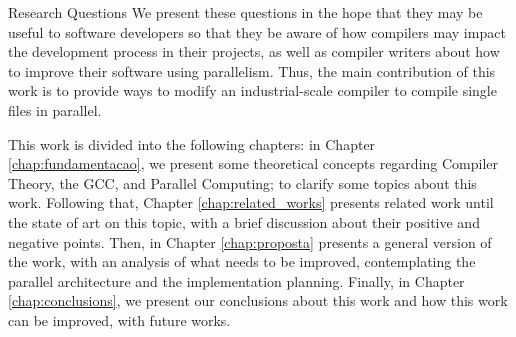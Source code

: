 \begin{section}{Research Questions}
We present these questions in the hope that they may be useful to software
developers so that they be aware of how compilers may impact the development
process in their projects, as well as compiler writers about how to improve
their software using parallelism. Thus, the main contribution of this work is
to provide ways to modify an industrial-scale compiler to
compile single files in parallel.

This work is divided into the following chapters: in Chapter
\ref{chap:fundamentacao}, we present some theoretical concepts regarding
Compiler Theory, the GCC,  and Parallel Computing; to clarify some topics about this work.
Following that, Chapter \ref{chap:related_works} presents related work until
the state of art on this topic, with a brief discussion about their positive
and negative points. Then, in Chapter \ref{chap:proposta} presents a general
version of the work, with an analysis of what needs to be improved,
contemplating the parallel architecture and the implementation planning. Finally,
in Chapter \ref{chap:conclusions}, we present our conclusions about this work
and how this work can be improved, with future works.


\end{section}
